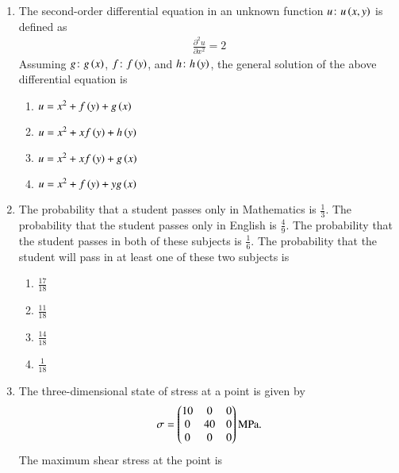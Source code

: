 \documentclass[journal,12pt,onecolumn]{article}
\theoremstyle{remark}
\begin{document}
\begin{enumerate}
    \item The second-order differential equation in an unknown function $u\colon u\left(x, y\right)$ is defined as
    \begin{align}
    \frac{\partial^2 u}{\partial x^2} = 2
    \end{align}
    Assuming $g\colon g\left(x\right)$, $f\colon f\left(y\right)$, and $h\colon h\left(y\right)$, the general solution of the above differential equation is

    \hfill{}
    \begin{enumerate}
        \item $u = x^2 + f\left(y\right) + g\left(x\right)$
        \item $u = x^2 + x f\left(y\right) + h\left(y\right)$
        \item $u = x^2 + x f\left(y\right) + g\left(x\right)$
        \item $u = x^2 + f\left(y\right) + y g\left(x\right)$
    \end{enumerate}

    \item The probability that a student passes only in Mathematics is $\frac{1}{3}$. The probability that the student passes only in English is $\frac{4}{9}$. The probability that the student passes in both of these subjects is $\frac{1}{6}$. The probability that the student will pass in at least one of these two subjects is

    \hfill{}
    \begin{enumerate}
        \item $\frac{17}{18}$
        \item $\frac{11}{18}$
        \item $\frac{14}{18}$
        \item $\frac{1}{18}$
    \end{enumerate}

    \item The three-dimensional state of stress at a point is given by
    \begin{align}
    \sigma = \begin{pmatrix}10 & 0 & 0 \\ 0 & 40 & 0 \\ 0 & 0 & 0\end{pmatrix} \text{MPa.}
    \end{align}
    The maximum shear stress at the point is

    \hfill{}
    \begin{enumerate}
    \end{enumerate}


\end{enumerate}
\end{document}
